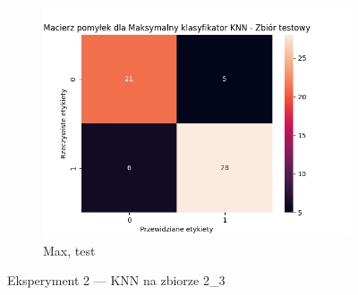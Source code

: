 \documentclass[12pt]{article}
\newcommand*{\subfigwidth}{0.24\textwidth}
\begin{document}
\begin{figure}[H]
\begin{subfigure}[t]{\subfigwidth}
        \includegraphics[width=\linewidth]{img/exp_2/knn/2_3/max/test_matrix.png}
        \caption{Max, test}
    \end{subfigure} 
    
    \caption{Eksperyment 2 --- KNN na zbiorze 2\_3}
\end{figure}

\clearpage
\end{document}

